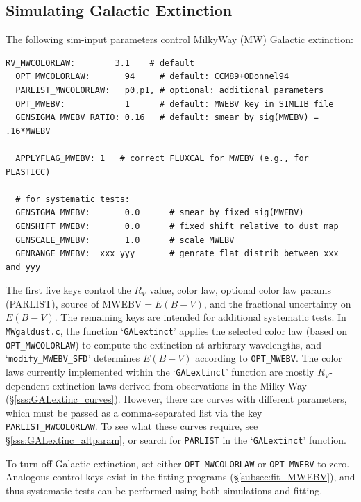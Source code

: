 \documentclass[12pt]{article}
\newcommand{\mwebv}{MWEBV}
\begin{document}
{%
   \clearpage
   \subsection{Simulating Galactic Extinction}
   \label{subsec:sim_MWEBV}

The following sim-input parameters control MilkyWay (MW) 
Galactic extinction:
%
\begin{Verbatim}[frame=single]
  RV_MWCOLORLAW:        3.1    # default
  OPT_MWCOLORLAW:       94     # default: CCM89+ODonnel94
  PARLIST_MWCOLORLAW:   p0,p1, # optional: additional parameters
  OPT_MWEBV:            1      # default: MWEBV key in SIMLIB file
  GENSIGMA_MWEBV_RATIO: 0.16   # default: smear by sig(MWEBV) = .16*MWEBV

  APPLYFLAG_MWEBV: 1   # correct FLUXCAL for MWEBV (e.g., for PLASTICC)

  # for systematic tests:
  GENSIGMA_MWEBV:       0.0      # smear by fixed sig(MWEBV) 
  GENSHIFT_MWEBV:       0.0      # fixed shift relative to dust map
  GENSCALE_MWEBV:       1.0      # scale MWEBV 
  GENRANGE_MWEBV:  xxx yyy       # genrate flat distrib between xxx and yyy
\end{Verbatim}
%
The first five keys control the $R_V$ value, color law, optional color law params (PARLIST), 
source of {\mwebv}$= E(B-V)$,
and the fractional uncertainty on $E(B-V)$. 
The remaining keys are intended for additional systematic tests.
In {\tt MWgaldust.c}, the function `{\tt GALextinct}'
applies the selected color law (based on {\tt OPT\_MWCOLORLAW}) 
to compute the extinction at arbitrary wavelengths,
and `{\tt modify\_MWEBV\_SFD}' determines $E(B-V)$
according to {\tt OPT\_MWEBV}. The color laws currently
implemented within the `{\tt GALextinct}' function are mostly
$R_V$-dependent extinction laws derived from observations
in the Milky Way (\S\ref{sss:GALextinc_curves}). However,
there are curves with different parameters, which must be
passed as a comma-separated list via the key
\verb!PARLIST_MWCOLORLAW!. To see what these curves require,
see \S\ref{sss:GALextinc_altparam}, or search for \verb!PARLIST!
in the `{\tt GALextinct}' function.

To turn off Galactic extinction, set either
{\tt OPT\_MWCOLORLAW} or {\tt OPT\_MWEBV} to zero.
Analogous control keys exist in the fitting programs 
(\S\ref{subsec:fit_MWEBV}),
and thus systematic tests can be performed using
both simulations and fitting.

}
\end{document}
